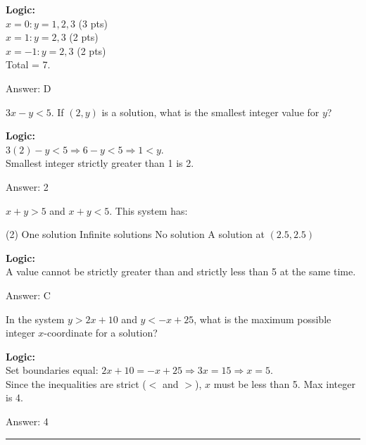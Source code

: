 \documentclass[11pt,paper=a4,answers]{exam}
\begin{document}
\begin{questions}
\begin{solution}
\textbf{Logic:} \\
$x=0: y=1,2,3$ (3 pts) \\
$x=1: y=2,3$ (2 pts) \\
$x=-1: y=2,3$ (2 pts) \\
Total = 7.

\vspace{15pt}
Answer: \colorbox{yellow!100}{D}
\end{solution}

\question
$3x - y < 5$. If $(2, y)$ is a solution, what is the smallest integer value for $y$?

\begin{solution}
\textbf{Logic:} \\
$3(2) - y < 5 \Rightarrow 6 - y < 5 \Rightarrow 1 < y$. \\
Smallest integer strictly greater than 1 is 2.

\vspace{15pt}
Answer: \colorbox{yellow!100}{2}
\end{solution}

\question
$x + y > 5$ and $x + y < 5$. This system has:
\begin{tasks}(2)
    \task One solution
    \task Infinite solutions
    \task No solution
    \task A solution at $(2.5, 2.5)$
\end{tasks}

\begin{solution}
\textbf{Logic:} \\
A value cannot be strictly greater than and strictly less than 5 at the same time.

\vspace{15pt}
Answer: \colorbox{yellow!100}{C}
\end{solution}

\question
In the system $y > 2x + 10$ and $y < -x + 25$, what is the maximum possible integer $x$-coordinate for a solution?

\begin{solution}
\textbf{Logic:} \\
Set boundaries equal: $2x + 10 = -x + 25 \Rightarrow 3x = 15 \Rightarrow x = 5$. \\
Since the inequalities are strict ($<$ and $>$), $x$ must be less than 5. Max integer is 4.

\vspace{15pt}
Answer: \colorbox{yellow!100}{4}
\end{solution}


\end{questions}
\begin{center}
\rule{.5\textwidth}{1pt}
\end{center}
\end{document}
